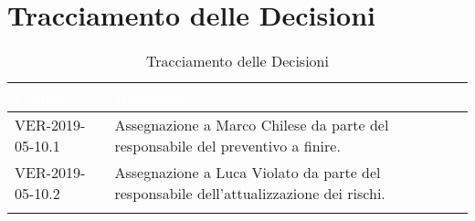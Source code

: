\section{Tracciamento delle Decisioni}

\begin{longtable}{|C{.33\textwidth}|C{.61\textwidth}|}
\hline
{}\textbf{\textcolor{white}{Codice}} & \textbf{\textcolor{white}{Decisione}}\\
\hline
VER-2019-05-10.1 & Assegnazione a Marco Chilese da parte del responsabile del preventivo a finire.\\
\hline
VER-2019-05-10.2 & Assegnazione a Luca Violato da parte del responsabile dell'attualizzazione dei rischi.\\
\hline
\caption{Tracciamento delle Decisioni}
\end{longtable}
